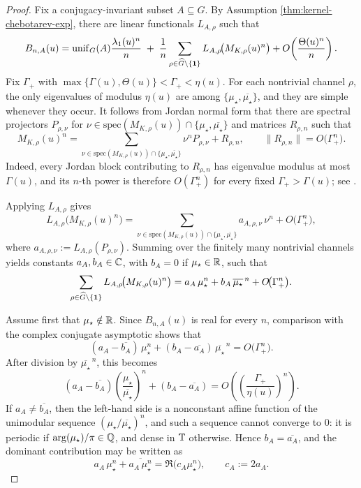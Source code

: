 \begin{proof}
Fix a conjugacy-invariant subset \(A\subseteq G\). By Assumption \ref{thm:kernel-chebotarev-exp}, there are linear functionals \(L_{A,\rho}\) such that
\[
B_{n,A}(u)
=
\mathrm{unif}_G(A)\frac{\lambda_1(u)^n}{n}
\;+\;
\frac{1}{n}\sum_{\rho\in\widehat G\setminus\{\mathbf{1}\}}L_{A,\rho}\!\bigl(M_{K,\rho}(u)^n\bigr)
+O\!\left(\frac{\Theta(u)^n}{n}\right).
\]
Fix \(\Gamma_+\) with \(\max\{\Gamma(u),\Theta(u)\}<\Gamma_+<\eta(u)\). For each nontrivial channel \(\rho\), the only eigenvalues of modulus \(\eta(u)\) are among \(\{\mu_\star,\overline{\mu_\star}\}\), and they are simple whenever they occur. It follows from Jordan normal form that there are spectral projectors \(P_{\rho,\nu}\) for \(\nu\in\mathrm{spec}(M_{K,\rho}(u))\cap\{\mu_\star,\overline{\mu_\star}\}\) and matrices \(R_{\rho,n}\) such that
\[
M_{K,\rho}(u)^n
=
\sum_{\nu\in\mathrm{spec}(M_{K,\rho}(u))\cap\{\mu_\star,\overline{\mu_\star}\}}
\nu^nP_{\rho,\nu}
+
R_{\rho,n},
\qquad
\|R_{\rho,n}\|=O\!\bigl(\Gamma_+^n\bigr).
\]
Indeed, every Jordan block contributing to \(R_{\rho,n}\) has eigenvalue modulus at most \(\Gamma(u)\), and its \(n\)-th power is therefore \(O(\Gamma_+^n)\) for every fixed \(\Gamma_+>\Gamma(u)\); see \cite[Chapter 6]{HornJohnson2013}.

Applying \(L_{A,\rho}\) gives
\[
L_{A,\rho}\!\bigl(M_{K,\rho}(u)^n\bigr)
=
\sum_{\nu\in\mathrm{spec}(M_{K,\rho}(u))\cap\{\mu_\star,\overline{\mu_\star}\}}
a_{A,\rho,\nu}\,\nu^n
+
O\!\bigl(\Gamma_+^n\bigr),
\]
where \(a_{A,\rho,\nu}:=L_{A,\rho}(P_{\rho,\nu})\). Summing over the finitely many nontrivial channels yields constants \(a_A,b_A\in\mathbb{C}\), with \(b_A=0\) if \(\mu_\star\in\mathbb{R}\), such that
\[
\sum_{\rho\in\widehat G\setminus\{\mathbf{1}\}}L_{A,\rho}\!\bigl(M_{K,\rho}(u)^n\bigr)
=
a_A\,\mu_\star^n+b_A\,\overline{\mu_\star}^{\,n}
+
O\!\bigl(\Gamma_+^n\bigr).
\]

Assume first that \(\mu_\star\notin\mathbb{R}\). Since \(B_{n,A}(u)\) is real for every \(n\), comparison with the complex conjugate asymptotic shows that
\[
(a_A-\overline{b_A})\,\mu_\star^n
+
(b_A-\overline{a_A})\,\overline{\mu_\star}^{\,n}
=
O\!\bigl(\Gamma_+^n\bigr).
\]
After division by \(\overline{\mu_\star}^{\,n}\), this becomes
\[
(a_A-\overline{b_A})\left(\frac{\mu_\star}{\overline{\mu_\star}}\right)^n
+
(b_A-\overline{a_A})
=
O\!\left(\left(\frac{\Gamma_+}{\eta(u)}\right)^n\right).
\]
If \(a_A\neq\overline{b_A}\), then the left-hand side is a nonconstant affine function of the unimodular sequence \((\mu_\star/\overline{\mu_\star})^n\), and such a sequence cannot converge to \(0\): it is periodic if \(\arg(\mu_\star)/\pi\in\mathbb{Q}\), and dense in \(\mathbb{T}\) otherwise. Hence \(b_A=\overline{a_A}\), and the dominant contribution may be written as
\[
a_A\,\mu_\star^n+\overline{a_A\,\mu_\star^n}
=
\Re\!\bigl(c_A\mu_\star^n\bigr),
\qquad
c_A:=2a_A.
\]


\end{proof}
